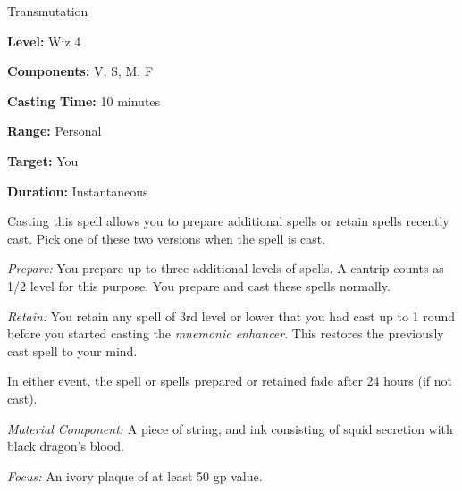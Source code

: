 
Transmutation

\textbf{Level:} Wiz 4

\textbf{Components:} V, S, M, F

\textbf{Casting Time:} 10 minutes

\textbf{Range:} Personal

\textbf{Target:} You

\textbf{Duration:} Instantaneous

Casting this spell allows you to prepare additional spells or retain spells recently 
cast. Pick one of these two versions when the spell is cast.

\textit{Prepare:} You prepare up to three additional levels of spells. A cantrip 
counts as 1/2 level for this purpose. You prepare and cast these spells normally.

\textit{Retain:} You retain any spell of 3rd level or lower that you had cast up 
to 1 round before you started casting the \textit{mnemonic enhancer}. This restores 
the previously cast spell to your mind.

In either event, the spell or spells prepared or retained fade after 24 hours (if 
not cast).

\textit{Material Component:} A piece of string, and ink consisting of squid secretion 
with black dragon's blood.

\textit{Focus:} An ivory plaque of at least 50 gp value.

